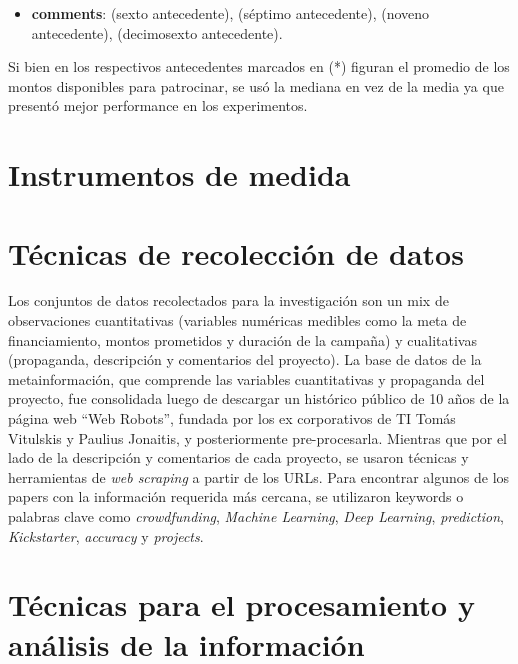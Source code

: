\begin{itemize}
	\item \textbf{comments}: \citeauthor{pr_li2016predcrowd} (sexto antecedente), \citeauthor{pr_kaur2017socmedcrowd} (séptimo antecedente), \citeauthor{pr_jin2019dayssuccess} (noveno antecedente), \citeauthor{pr_lee2018contentDL} (decimosexto antecedente).
\end{itemize}

Si bien en los respectivos antecedentes marcados en (*) figuran el promedio de los montos disponibles para patrocinar, se usó la mediana en vez de la media ya que presentó mejor performance en los experimentos.

\section{Instrumentos de medida}


\section{Técnicas de recolección de datos}
Los conjuntos de datos recolectados para la investigación son un mix de observaciones cuantitativas (variables numéricas medibles como la meta de financiamiento, montos prometidos y duración de la campaña) y cualitativas (propaganda, descripción y comentarios del proyecto). La base de datos de la metainformación, que comprende las variables cuantitativas y propaganda del proyecto, fue consolidada luego de descargar un histórico público de 10 años de la página web “Web Robots”, fundada por los ex corporativos de TI Tomás Vitulskis y Paulius Jonaitis, y posteriormente pre-procesarla. Mientras que por el lado de la descripción y comentarios de cada proyecto, se usaron técnicas y herramientas de \textit{web scraping} a partir de los URLs. Para encontrar algunos de los papers con la información requerida más cercana, se utilizaron keywords o palabras clave como \textit{crowdfunding}, \textit{Machine Learning}, \textit{Deep Learning}, \textit{prediction}, \textit{Kickstarter}, \textit{accuracy} y \textit{projects}.


\section{Técnicas para el procesamiento y análisis de la información}



